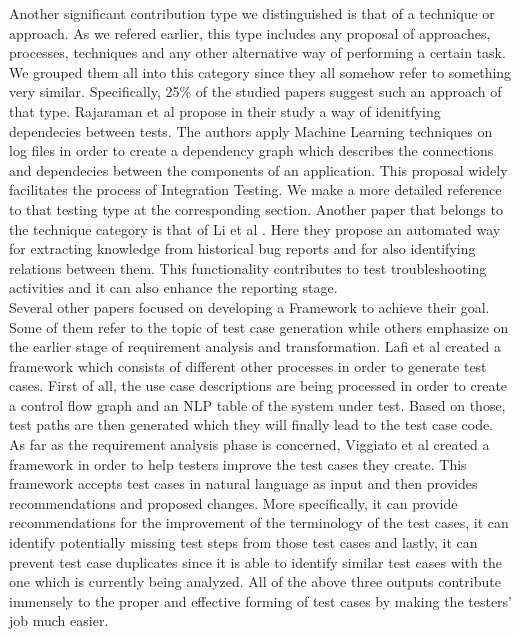 Another significant contribution type we distinguished is that of a technique or approach. As we refered earlier, this type includes any proposal of approaches, processes, techniques and any 
other alternative way of performing a certain task. We grouped them all into this category since they all somehow refer to something very similar. Specifically, 25\% of the
studied papers suggest such an approach of that type. Rajaraman et al \cite{9197868} propose in their study a way of idenitfying dependecies between tests. The authors apply Machine Learning techniques 
on log files in order to create a dependency graph which describes the connections and dependecies between the components of an application. This proposal widely facilitates the process of Integration 
Testing. We make a more detailed reference to that testing type at the corresponding section. Another paper that belongs to the technique category is that of Li et al \cite{li2022towards}. Here they propose 
an automated way for extracting knowledge from historical bug reports and for also identifying relations between them. This functionality contributes to test troubleshooting activities and it can also enhance 
the reporting stage.\\

Several other papers focused on developing a Framework to achieve their goal. Some of them refer to the topic of test case generation while others 
emphasize on the earlier stage of requirement analysis and transformation. Lafi et al \cite{9491761} created a framework which consists of different other 
processes in order to generate test cases. First of all, the use case descriptions are being processed in order to create a control flow graph and an NLP table of the 
system under test. Based on those, test paths are then generated which they will finally lead to the test case code. As far as the requirement analysis phase 
is concerned, Viggiato et al \cite{viggiato2022using} created a framework in order to help testers improve the test cases they create. This framework 
accepts test cases in natural language as input and then provides recommendations and proposed changes. More specifically, it can provide recommendations 
for the improvement of the terminology of the test cases, it can identify potentially missing test steps from those test cases and lastly, it can 
prevent test case duplicates since it is able to identify similar test cases with the one which is currently being analyzed. All of the above three 
outputs contribute immensely to the proper and effective forming of test cases by making the testers' job much easier. \\

